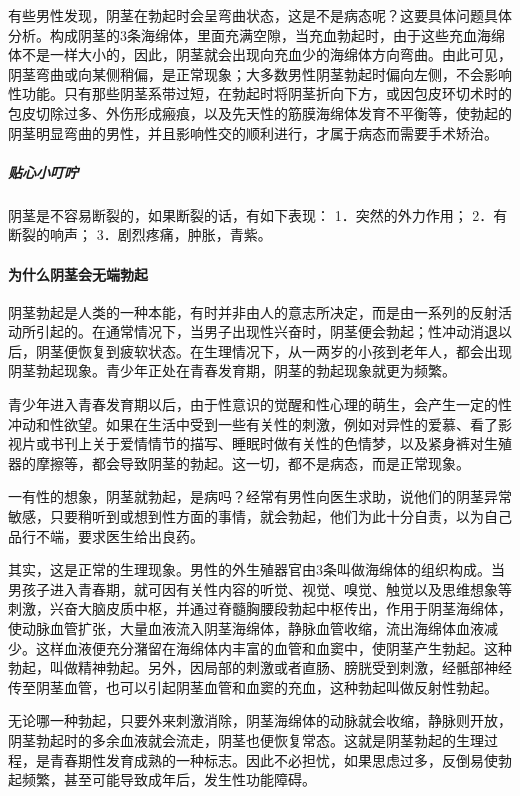 \begin{enumerate}
有些男性发现，阴茎在勃起时会呈弯曲状态，这是不是病态呢？这要具体问题具体分析。构成阴茎的3条海绵体，里面充满空隙，当充血勃起时，由于这些充血海绵体不是一样大小的，因此，阴茎就会出现向充血少的海绵体方向弯曲。由此可见，阴茎弯曲或向某侧稍偏，是正常现象；大多数男性阴茎勃起时偏向左侧，不会影响性功能。只有那些阴茎系带过短，在勃起时将阴茎折向下方，或因包皮环切术时的包皮切除过多、外伤形成瘢痕，以及先天性的筋膜海绵体发育不平衡等，使勃起的阴茎明显弯曲的男性，并且影响性交的顺利进行，才属于病态而需要手术矫治。

\subparagraph{贴心小叮咛}

阴茎是不容易断裂的，如果断裂的话，有如下表现：
1．突然的外力作用；
2．有断裂的响声；
3．剧烈疼痛，肿胀，青紫。

\paragraph{为什么阴茎会无端勃起}

阴茎勃起是人类的一种本能，有时并非由人的意志所决定，而是由一系列的反射活动所引起的。在通常情况下，当男子出现性兴奋时，阴茎便会勃起；性冲动消退以后，阴茎便恢复到疲软状态。在生理情况下，从一两岁的小孩到老年人，都会出现阴茎勃起现象。青少年正处在青春发育期，阴茎的勃起现象就更为频繁。

青少年进入青春发育期以后，由于性意识的觉醒和性心理的萌生，会产生一定的性冲动和性欲望。如果在生活中受到一些有关性的刺激，例如对异性的爱慕、看了影视片或书刊上关于爱情情节的描写、睡眠时做有关性的色情梦，以及紧身裤对生殖器的摩擦等，都会导致阴茎的勃起。这一切，都不是病态，而是正常现象。

一有性的想象，阴茎就勃起，是病吗？经常有男性向医生求助，说他们的阴茎异常敏感，只要稍听到或想到性方面的事情，就会勃起，他们为此十分自责，以为自己品行不端，要求医生给出良药。

其实，这是正常的生理现象。男性的外生殖器官由3条叫做海绵体的组织构成。当男孩子进入青春期，就可因有关性内容的听觉、视觉、嗅觉、触觉以及思维想象等刺激，兴奋大脑皮质中枢，并通过脊髓胸腰段勃起中枢传出，作用于阴茎海绵体，使动脉血管扩张，大量血液流入阴茎海绵体，静脉血管收缩，流出海绵体血液减少。这样血液便充分潴留在海绵体内丰富的血管和血窦中，使阴茎产生勃起。这种勃起，叫做精神勃起。另外，因局部的刺激或者直肠、膀胱受到刺激，经骶部神经传至阴茎血管，也可以引起阴茎血管和血窦的充血，这种勃起叫做反射性勃起。

无论哪一种勃起，只要外来刺激消除，阴茎海绵体的动脉就会收缩，静脉则开放，阴茎勃起时的多余血液就会流走，阴茎也便恢复常态。这就是阴茎勃起的生理过程，是青春期性发育成熟的一种标志。因此不必担忧，如果思虑过多，反倒易使勃起频繁，甚至可能导致成年后，发生性功能障碍。


\end{enumerate}
